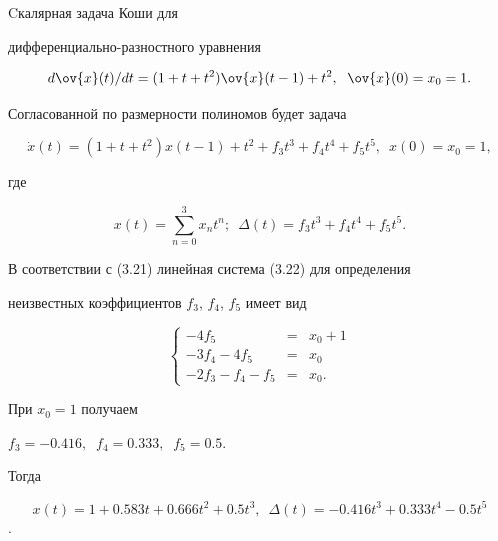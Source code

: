 




\begin{exams} Cкалярная задача Коши для


дифферен\-ци\-ально-разностного уравнения


$$


d\ov{x}(t)/dt=(1+t+t^2)\ov{x}(t-1)+t^2,\ \; \ov{x}(0)=x_0=1.


$$


Согласованной по размерности полиномов будет задача


$$


\Dot{x}(t)=(1+t+t^2){x}(t-1)+t^2+f_3t^3+f_4t^4+f_5t^5,\ \;


x(0)=x_0=1,


$$


где


$$


x(t)=\sum_{n=0}^3x_nt^n;\ \; \Delta(t)=f_3t^3+f_4t^4+f_5t^5.


$$





В соответствии с (3.21) линейная система (3.22) для определения


неизвестных коэффициентов $f_3$, $f_4$, $f_5$ имеет вид


$$


\left\{


\begin {array}{rcl}


-4f_5 &=& x_0+1\\


-3f_4 -4f_5 &=& x_0  \\


-2f_3 -f_4 -f_5 &=& x_0.


\end{array}


\right .


$$


При $x_0=1$ получаем


$f_3=-0.416,\;\;f_4=0.333,\;\;f_5=0.5$.


Тогда


$$


x(t)=1+0.583t+0.666t^2+0.5t^3,\ \;\Delta(t)=


-0.416t^3+0.333t^4-0.5t^5


$$.


\end{exams}





